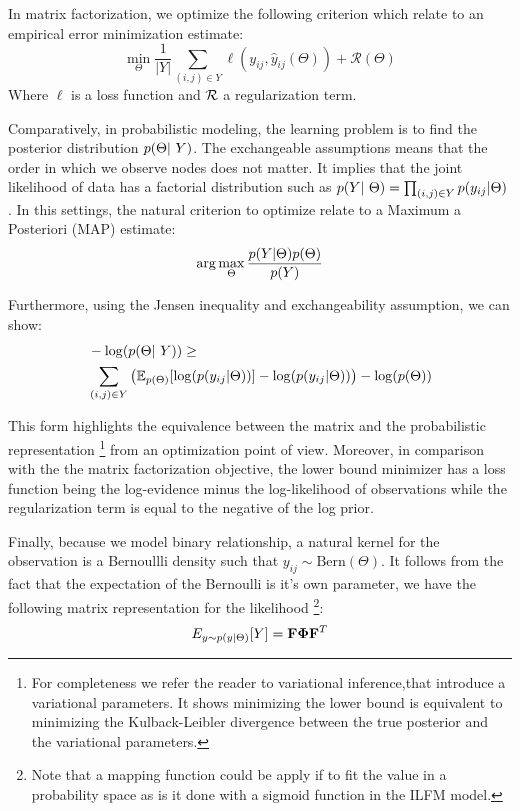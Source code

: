 In matrix factorization, we optimize the following criterion which relate to an empirical error minimization estimate:
\begin{displaymath}
    \min\limits_{\Theta} \frac{1}{|Y|} \sum_{(i,j) \in Y} \ell(y_{ij}, \hat y_{ij}(\Theta)) + \mathcal{R}(\Theta)
\end{displaymath}
Where $\ell$ is a loss function and $\cal R$ a regularization term.

Comparatively, in probabilistic modeling, the learning problem is to find the posterior distribution $\p(\Theta | Y)$. The exchangeable assumptions means that the order in which we observe nodes does not matter. It implies that the joint likelihood of data has a factorial distribution such as $\p(Y | \Theta) = \prod_{(i,j) \in Y} \p(y_{ij}| \Theta)$. In this settings, the natural criterion to optimize relate to a Maximum a Posteriori (MAP) estimate: 
\begin{displaymath}
    \mathrm{arg}\max\limits_{\Theta}  \frac{p(Y | \Theta) p(\Theta)}{p(Y)}
\end{displaymath}

Furthermore, using the Jensen inequality and exchangeability assumption, we can show:
\begin{align}
    &- \log(\p(\Theta | Y)) \geq \nonumber \\  
    &\sum_{(i,j) \in Y} \left( \E_{p(\Theta)}[\log(\p(y_{ij}|\Theta))] - \log(\p(y_{ij}|\Theta)) \right) - \log(\p(\Theta))
\end{align}	


This form highlights the equivalence between the matrix and the probabilistic representation \footnote{For completeness we refer the reader to variational inference,that introduce a variational parameters. It shows minimizing the lower bound is equivalent to minimizing the Kulback-Leibler divergence between the true posterior and the variational parameters.} from an optimization point of view. Moreover, in comparison with the  the matrix factorization objective, the lower bound minimizer has a loss function being the log-evidence minus the log-likelihood of observations while the regularization term is equal to the negative of the log prior.


Finally, because we model binary relationship, a natural kernel for the observation is a Bernoullli density such that $y_{ij} \sim \text{Bern}(\Theta)$. It follows from the fact that the expectation of the Bernoulli is it's own parameter, we have the following matrix representation for the likelihood \footnote{Note that a mapping function could be apply if to fit the value in a probability space as is it done with a sigmoid function in the ILFM model.}:
\begin{equation}
E_{y \sim p(y \mid \Theta)}[Y] = \mathbf{F} \mathbf{\Phi}  \mathbf{F}^T
\end{equation}


